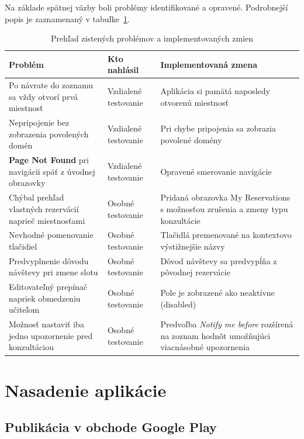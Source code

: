 Na základe spätnej väzby boli problémy identifikované a opravené. Podrobnejší popis je zaznamenaný v tabuľke~\ref{tab:testovanie-zmeny}.

\begin{table}[t]
\centering
\caption{Prehľad zistených problémov a implementovaných zmien}
\label{tab:testovanie-zmeny}
\begin{tabular}{|p{4.5cm}|p{3cm}|p{5cm}|}
\hline
\textbf{Problém} & \textbf{Kto nahlásil} & \textbf{Implementovaná zmena} \\
\hline
Po návrate do zoznamu sa vždy otvorí prvá miestnosť & Vzdialené testovanie & Aplikácia si pamätá naposledy otvorenú miestnosť \\
\hline
Nepripojenie bez zobrazenia povolených domén & Vzdialené testovanie & Pri chybe pripojenia sa zobrazia povolené domény \\
\hline
\textbf{Page Not Found} pri navigácii späť z úvodnej obrazovky & Vzdialené testovanie & Opravené smerovanie navigácie \\
\hline
Chýbal prehľad vlastných rezervácií naprieč miestnosťami & Osobné testovanie & Pridaná obrazovka My Reservations s možnosťou zrušenia a zmeny typu konzultácie \\
\hline
Nevhodné pomenovanie tlačidiel & Osobné testovanie & Tlačidlá premenované na kontextovo výstižnejšie názvy \\
\hline
Predvyplnenie dôvodu návštevy pri zmene slotu & Osobné testovanie & Dôvod návštevy sa predvypĺňa z pôvodnej rezervácie \\
\hline
Editovateľný prepínač napriek obmedzeniu učiteľom & Osobné testovanie & Pole je zobrazené ako neaktívne (disabled) \\
\hline
Možnosť nastaviť iba jedno upozornenie pred konzultáciou & Osobné testovanie & Predvoľba \textit{Notify me before} rozšírená na zoznam hodnôt umožňujúci viacnásobné upozornenia \\
\hline
\end{tabular}
\end{table}

\section{Nasadenie aplikácie}

\subsection{Publikácia v obchode Google Play}


